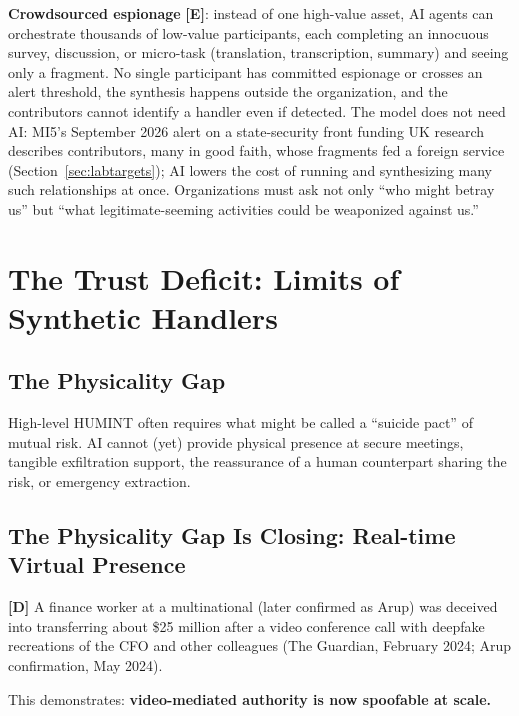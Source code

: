\documentclass[11pt,letterpaper]{article}
\begin{document}
\textbf{Crowdsourced espionage} \textbf{[E]}: instead of one high-value asset, AI agents can orchestrate thousands of low-value participants, each completing an innocuous survey, discussion, or micro-task (translation, transcription, summary) and seeing only a fragment. No single participant has committed espionage or crosses an alert threshold, the synthesis happens outside the organization, and the contributors cannot identify a handler even if detected. The model does not need AI: MI5's September 2026 alert on a state-security front funding UK research describes contributors, many in good faith, whose fragments fed a foreign service (Section~\ref{sec:labtargets}); AI lowers the cost of running and synthesizing many such relationships at once. Organizations must ask not only ``who might betray us'' but ``what legitimate-seeming activities could be weaponized against us.''

\section{The Trust Deficit: Limits of Synthetic Handlers}\label{sec:trust}

\subsection{The Physicality Gap}

High-level HUMINT often requires what might be called a ``suicide pact'' of mutual risk. AI cannot (yet) provide physical presence at secure meetings, tangible exfiltration support, the reassurance of a human counterpart sharing the risk, or emergency extraction.

\subsection{The Physicality Gap Is Closing: Real-time Virtual Presence}

\begin{criticalbox}
\textbf{[D]} A finance worker at a multinational (later confirmed as Arup) was deceived into transferring about \$25 million after a video conference call with deepfake recreations of the CFO and other colleagues (The Guardian, February 2024; Arup confirmation, May 2024).

This demonstrates: \textbf{video-mediated authority is now spoofable at scale.}
\end{criticalbox}
\end{document}
